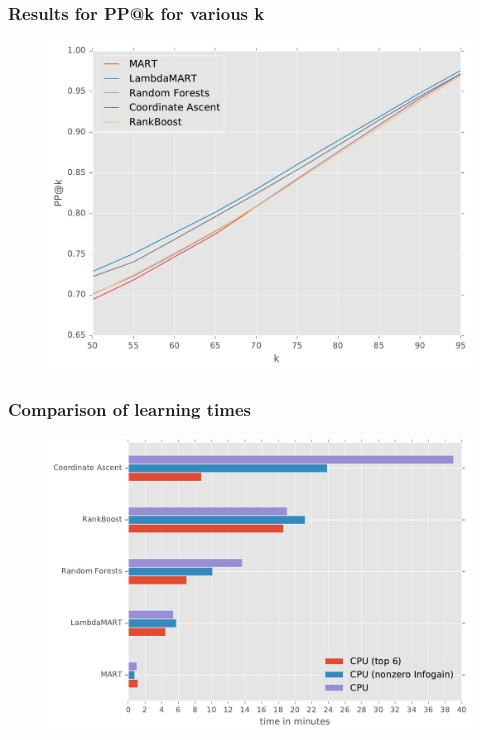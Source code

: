 \begin{frame}
  \frametitle{Results for PP@k for various k}
  \begin{figure}[tbph]
    \centering
    \includegraphics[width=0.95\linewidth]{images/results_pp_k}
  \end{figure}
\end{frame}

\begin{frame}
  \frametitle{Comparison of learning times}
  \begin{figure}[tbph]
    \centering
    \includegraphics[width=0.95\linewidth]{images/results_times}
  \end{figure}
\end{frame}